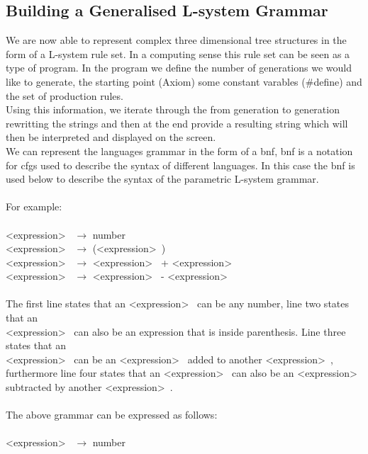 \subsection{Building a Generalised L-system Grammar}

We are now able to represent complex three dimensional tree structures in the form of a L-system rule set. In a computing sense this rule set can be seen as a type of program. In the program we define the number of generations we would like to generate, the starting point (Axiom) some constant varables (\#define) and the set of production rules. \\
Using this information, we iterate through the from generation to generation rewritting the strings and then at the end provide a resulting string which will then be interpreted and displayed on the screen.
\\
We can represent the languages grammar in the form of a \acrlong{bnf}, \acrshort{bnf} is a notation for \acrlong{cfg}s used to describe the syntax of different languages. In this case the \acrshort{bnf} is used below to describe the syntax of the parametric L-system grammar. \\
\\
For example: \\ 
\\
\textless expression\textgreater~ $\rightarrow$ number \\ 
\textless expression\textgreater~ $\rightarrow$ (\textless expression\textgreater~) \\
\textless expression\textgreater~ $\rightarrow$ \textless expression\textgreater~ + \textless expression\textgreater~ \\
\textless expression\textgreater~ $\rightarrow$ \textless expression\textgreater~ - \textless expression\textgreater~ \\
\\
The first line states that an \textless expression\textgreater~ can be any number, line two states that an \\ \textless expression\textgreater~ can also be an expression that is inside parenthesis. Line three states that an \\ \textless expression\textgreater~ can be an \textless expression\textgreater~ added to another \textless expression\textgreater~, furthermore line four states that an \textless expression\textgreater~ can also be an \textless expression\textgreater~ subtracted by another \textless expression\textgreater~. \\
\\
The above grammar can be expressed as follows: \\
\\
\textless expression\textgreater~ $\rightarrow$ number 

